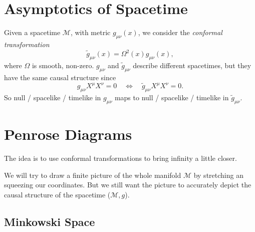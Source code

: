 
\section{Asymptotics of Spacetime}%
\label{sec:asymptotics_of_spacetime}

Given a spacetime $\mathcal{M}$, with metric $g_{\mu\nu}(x)$, we consider the \emph{conformal transformation}
\begin{equation}
  \widetilde{g}_{\mu\nu}(x) = \Omega^2 (x) g_{\mu\nu}(x),
\end{equation}
where $\Omega$ is smooth, non-zero.
$g_{\mu\nu}$ and $\widetilde{g}_{\mu\nu}$ describe different spacetimes, but they have the same causal structure since
\begin{equation}
  g_{\mu\nu} X^{\mu} X^{\nu} = 0 \quad \iff \quad \widetilde{g}_{\mu\nu} X^{\mu} X^{\nu} = 0.
\end{equation}
So null / spacelike / timelike in $g_{\mu\nu}$ maps to null / spacelike / timelike in $\widetilde{g}_{\mu\nu}$.

\section{Penrose Diagrams}%
\label{sec:penrose_diagrams}

The idea is to use conformal transformations to bring infinity a little closer.
\begin{leftbar}
  \begin{note}
    We will try to draw a finite picture of the whole manifold $\mathcal{M}$ by stretching an squeezing our coordinates. But we still want the picture to accurately depict the causal structure of the spacetime ($\mathcal{M}, g$).
  \end{note}
\end{leftbar}

\subsection{Minkowski Space}%
\label{sub:minkowski_space}

